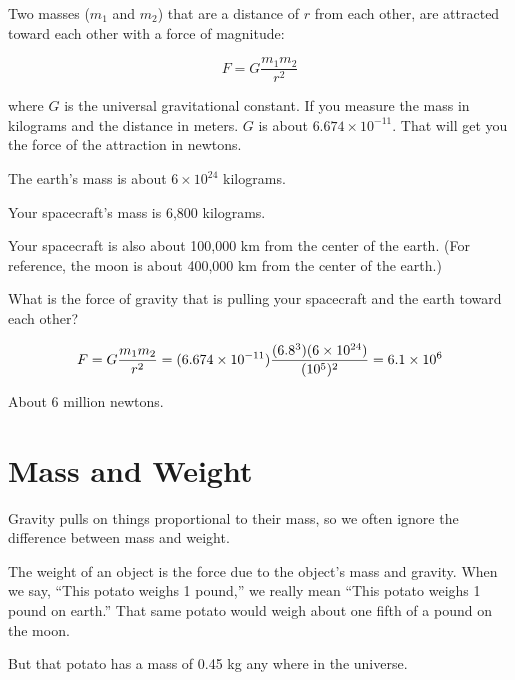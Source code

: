 \begin{mdframed}[style=important, frametitle={Newton's Law of Universal Gravitation}]

Two masses ($m_1$ and $m_2$) that are a distance of
$r$ from each other, are attracted toward each other with a force of
magnitude:

$$F = G\frac{m_1 m_2}{r^2}$$

where $G$ is the universal gravitational constant. If you measure the
mass in kilograms and the distance in meters. $G$ is about $6.674
\times 10^{-11}$.  That will get you the force of the attraction in
newtons.

\end{mdframed}

\begin{Exercise}[title={Gravity}, label=gravity_earth]
  
  The earth's mass is about $6 \times 10^{24}$ kilograms.

  Your spacecraft's mass is 6,800 kilograms.

  Your spacecraft is also about 100,000 km from the center of the earth. (For reference, the moon is about 400,000 km from the center of the earth.)

  What is the force of gravity that is pulling your spacecraft and the earth toward each other?

\end{Exercise}
\begin{Answer}[ref=gravity_earth]

  $$F = G\frac{m_1 m_2}{r^2} = (6.674 \times 10^{-11})\frac{(6.8 \time 10^3)(6 \times 10^{24})}{(10^5)^2} = 6.1 \times 10^{6}$$

  About 6 million newtons.
  
\end{Answer}

\section{Mass and Weight}

Gravity pulls on things proportional to their mass, so we often
ignore the difference between mass and weight.

The weight of an object is the force due to the object's mass and
gravity.  When we say, ``This potato weighs 1 pound,'' we really mean
``This potato weighs 1 pound on earth.''  That same potato would weigh
about one fifth of a pound on the moon.

But that potato has a mass of 0.45 kg any where in the universe.
